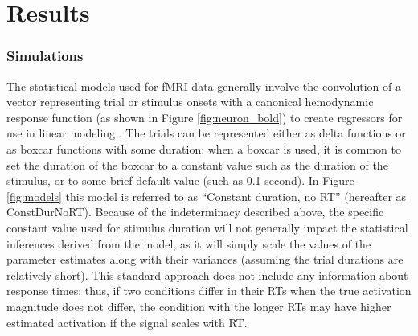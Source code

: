 \documentclass[titlepage,12pt] {article}
\begin{document}
\section*{Results}

\subsubsection*{Simulations}

The statistical models used for fMRI data generally involve the convolution of a vector representing trial or stimulus onsets with a canonical hemodynamic response function (as shown in Figure \ref{fig:neuron_bold})  to create regressors for use in linear modeling \citep{PoldrackMumfordNichols2009}.  The trials can be represented either as delta functions or as boxcar functions with some duration; when a boxcar is used, it is common to set the duration of the boxcar to a constant value such as the duration of the stimulus, or to some brief default value (such as 0.1 second).  In Figure \ref{fig:models} this model is referred to as ``Constant duration, no RT'' (hereafter as ConstDurNoRT).  Because of the indeterminacy described above, the specific constant value used for stimulus duration will not generally impact the statistical inferences derived from the model, as it will simply scale the values of the parameter estimates along with their variances (assuming the trial durations are relatively short).   This standard approach does not include any information about response times; thus, if two conditions differ in their RTs when the true activation magnitude does not differ, the condition with the longer RTs may have higher estimated activation if the signal scales with RT.  
\end{document}
